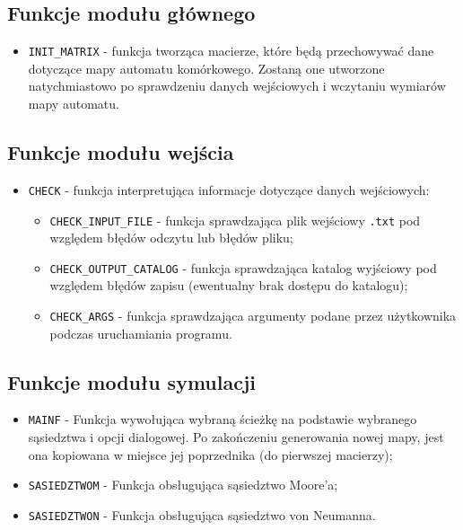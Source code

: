 \documentclass[a4paper,12pt]{article}
\begin{document}
\subsection{Funkcje modułu głównego}
\begin{itemize}
\item \texttt{INIT\_MATRIX} - funkcja tworząca macierze, które będą przechowywać dane dotyczące mapy automatu komórkowego. Zostaną one utworzone natychmiastowo po sprawdzeniu danych wejściowych i wczytaniu wymiarów mapy automatu.
\end{itemize}
\subsection{Funkcje modułu wejścia}
\begin{itemize}
\item \texttt{CHECK} - funkcja interpretująca informacje dotyczące danych wejściowych:
	\begin{itemize}
	\item \texttt{CHECK\_INPUT\_FILE} - funkcja sprawdzająca plik wejściowy \texttt{.txt} pod względem błędów odczytu lub błędów pliku;
	\item \texttt{CHECK\_OUTPUT\_CATALOG} - funkcja sprawdzająca katalog wyjściowy pod względem błędów zapisu (ewentualny brak dostępu do katalogu);
	\item \texttt{CHECK\_ARGS} - funkcja sprawdzająca argumenty podane przez użytkownika podczas uruchamiania programu.
	\end{itemize}
\end{itemize}
\subsection{Funkcje modułu symulacji}
\begin{itemize}
\item \texttt{MAINF} - Funkcja wywołująca wybraną ścieżkę na podstawie wybranego sąsiedztwa i opcji dialogowej. Po zakończeniu generowania nowej mapy, jest ona kopiowana w miejsce jej poprzednika (do pierwszej macierzy);
\item \texttt{SASIEDZTWOM} - Funkcja obsługująca sąsiedztwo Moore'a;
\item \texttt{SASIEDZTWON} - Funkcja obsługująca sąsiedztwo von Neumanna.
\end{itemize}
\end{document}
